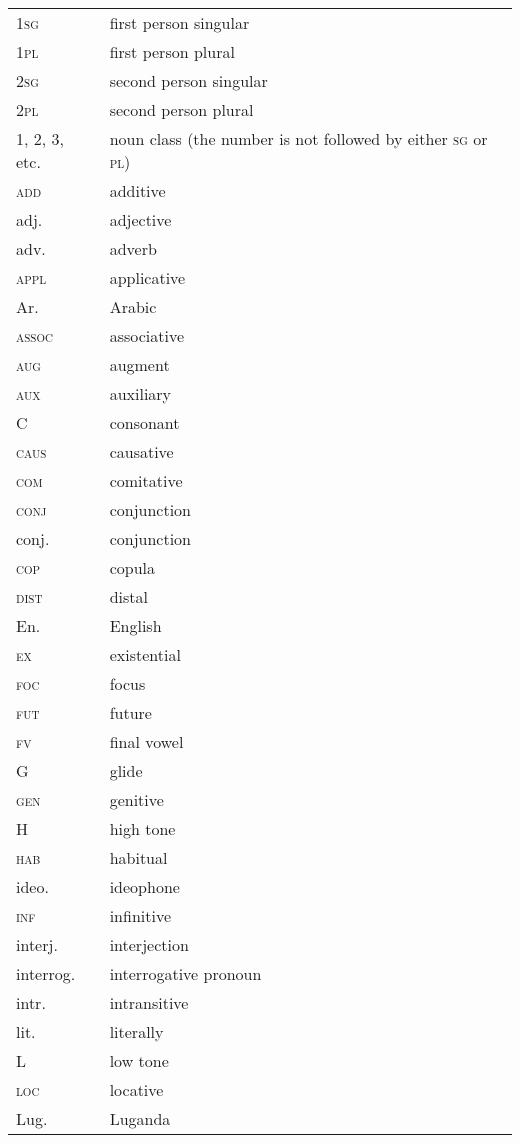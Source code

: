 \begin{tabularx}{.55\textwidth}{lQ}
1\textsc{sg} &  first person singular\\
1\textsc{pl} & first person plural\\
2\textsc{sg} &  second person singular\\
2\textsc{pl} & second person plural\\
1, 2, 3, etc. & noun class (the number is not followed by either \textsc{sg} or \textsc{pl})\\
\textsc{add} & additive\\
adj. & adjective\\
adv. & adverb\\
\textsc{appl} & applicative\\
Ar. & Arabic\\
\textsc{assoc} & associative\\
\textsc{aug} & augment\\
\textsc{aux} & auxiliary\\
C & consonant\\
\textsc{caus} & causative\\
\textsc{com} & comitative\\
\textsc{conj} & conjunction\\
conj. & conjunction\\
\textsc{cop} & copula\\
\textsc{dist} & distal\\
En. & English\\
\textsc{ex} & existential\\
\textsc{foc} & focus\\
\textsc{fut} & future\\
\textsc{fv} & final vowel\\
G & glide\\
\textsc{gen} & genitive\\
H & high tone\\
\textsc{hab} & habitual\\
ideo.& ideophone\\
\textsc{inf} & infinitive\\
interj.& interjection\\
interrog.& interrogative pronoun\\
intr. & intransitive\\
lit.  & literally\\
L & low tone\\
\textsc{loc} & locative\\
Lug. & Luganda\\
\end{tabularx}
